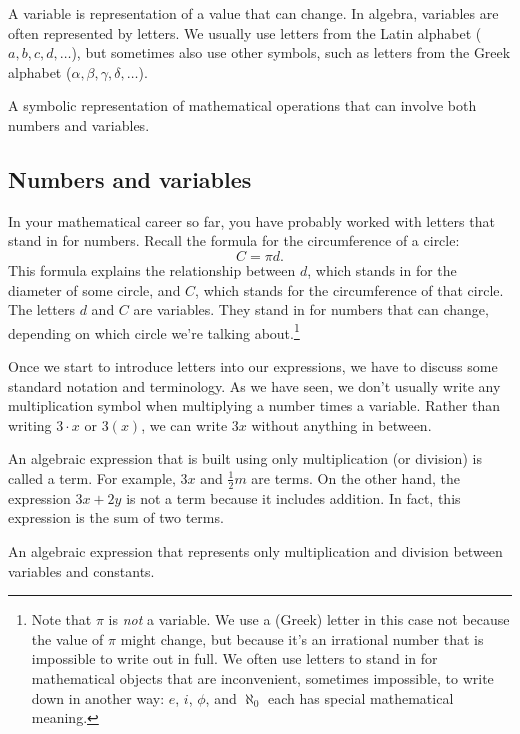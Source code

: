 \begin{boxeddef}[Variable]
A \gls{variable} is representation of a value that can change. In algebra, variables are often represented by letters. We usually use letters from the Latin alphabet ($a, b, c, d,\dotsc$), but sometimes also use other symbols, such as letters from the Greek alphabet ($\alpha, \beta, \gamma, \delta, \dotsc$).
\end{boxeddef}

\begin{boxeddef}
A symbolic representation of mathematical operations that can involve both numbers and variables.
\end{boxeddef}

\subsection{Numbers and variables}

In your mathematical career so far, you have probably worked with letters that stand in for numbers. Recall the formula for the circumference of a circle: \[C = \pi d.\]
This formula explains the relationship between $d$, which stands in for the diameter of some circle, and $C$, which stands for the circumference of that circle. The letters $d$ and $C$ are variables. They stand in for numbers that can change, depending on which circle we're talking about.\footnote{Note that $\pi$ is \textit{not} a variable. We use a (Greek) letter in this case not because the value of $\pi$ might change, but because it's an irrational number that is impossible to write out in full. We often use letters to stand in for mathematical objects that are inconvenient, sometimes impossible, to write down in another way: $e$, $i$, $\phi$, and $\aleph_0$ each has special mathematical meaning.}

Once we start to introduce letters into our expressions, we have to discuss some standard notation and terminology. As we have seen, we don't usually write any multiplication symbol when multiplying a number times a variable. Rather than writing $3\cdot x$ or $3(x)$, we can write $3x$ without anything in between.

An algebraic expression that is built using only multiplication (or division) is called a \gls{term}. For example, $3x$ and $\frac{1}{2}m$ are terms. On the other hand, the expression $3x+2y$ is not a term because it includes addition. In fact, this expression is the sum of two terms.

\begin{boxeddef}[Term]
An algebraic expression that represents only multiplication and division between variables and constants.
\end{boxeddef}


